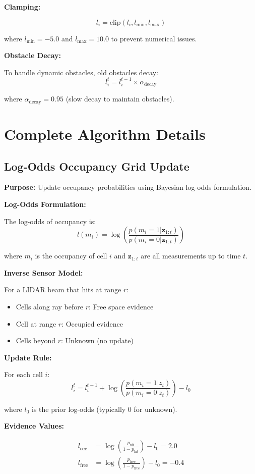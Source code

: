 \documentclass[11pt]{article}
\begin{document}
\textbf{Clamping:}

\[
l_i = \text{clip}(l_i, l_{\min}, l_{\max})
\]

where $l_{\min} = -5.0$ and $l_{\max} = 10.0$ to prevent numerical issues.

\textbf{Obstacle Decay:}

To handle dynamic obstacles, old obstacles decay:
\[
l_i^{t} = l_i^{t-1} \times \alpha_{\text{decay}}
\]

where $\alpha_{\text{decay}} = 0.95$ (slow decay to maintain obstacles).

\section{Complete Algorithm Details}

\subsection{Log-Odds Occupancy Grid Update}

\textbf{Purpose:} Update occupancy probabilities using Bayesian log-odds formulation.

\textbf{Log-Odds Formulation:}

The log-odds of occupancy is:
\[
l(m_i) = \log\left(\frac{p(m_i = 1 | \mathbf{z}_{1:t})}{p(m_i = 0 | \mathbf{z}_{1:t})}\right)
\]

where $m_i$ is the occupancy of cell $i$ and $\mathbf{z}_{1:t}$ are all measurements up to time $t$.

\textbf{Inverse Sensor Model:}

For a LIDAR beam that hits at range $r$:
\begin{itemize}
    \item Cells along ray before $r$: Free space evidence
    \item Cell at range $r$: Occupied evidence
    \item Cells beyond $r$: Unknown (no update)
\end{itemize}

\textbf{Update Rule:}

For each cell $i$:
\[
l_i^{t} = l_i^{t-1} + \log\left(\frac{p(m_i = 1 | z_t)}{p(m_i = 0 | z_t)}\right) - l_0
\]

where $l_0$ is the prior log-odds (typically 0 for unknown).

\textbf{Evidence Values:}

\begin{align}
l_{\text{occ}} &= \log\left(\frac{p_{\text{hit}}}{1 - p_{\text{hit}}}\right) - l_0 = 2.0 \\
l_{\text{free}} &= \log\left(\frac{p_{\text{free}}}{1 - p_{\text{free}}}\right) - l_0 = -0.4
\end{align}
\end{document}
